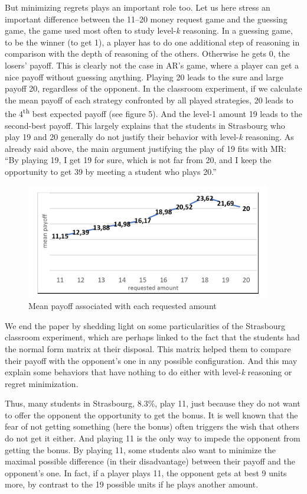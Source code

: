 \begin{Article}
\begin{refsection}[Umbhauer]
But minimizing regrets plays an important role too. Let us here stress
an important difference between the 11--20 money request game and the
guessing game, the game used most often to study level-\emph{k}
reasoning. In a guessing game, to be the winner (to get 1), a player has
to do one additional step of reasoning in comparison with the depth of
reasoning of the others. Otherwise he gets 0, the losers' payoff. This
is clearly not the case in AR's game, where a player can get a nice
payoff without guessing anything. Playing 20 leads to the sure and large
payoff 20, regardless of the opponent. In the classroom experiment, if
we calculate the mean payoff of each strategy confronted by all played
strategies, 20 leads to the 4\textsuperscript{th} best expected payoff
(see figure 5). And the level-1 amount 19 leads to the second-best
payoff. This largely explains that the students in Strasbourg who play
19 and 20 generally do not justify their behavior with level-\emph{k}
reasoning. As already said above, the main argument justifying the play
of 19 fits with MR: ``By playing 19, I get 19 for sure, which is not far
from 20, and I keep the opportunity to get 39 by meeting a student who
plays 20.''


\begin{figure}[h]
    \centering
    \caption{Mean payoff associated with each requested amount}
    \includegraphics[height=5cm]{Articles-bons-a-composer/07_Umbhauer_en/07_Umbhauer_en_figures/Umbhauer_fig5.jpeg}
\end{figure}


We end the paper by shedding light on some particularities of the
Strasbourg classroom experiment, which are perhaps linked to the fact
that the students had the normal form matrix at their disposal. This
matrix helped them to compare their payoff with the opponent's one in
any possible configuration. And this may explain some behaviors that
have nothing to do either with level-\emph{k} reasoning or regret
minimization.

Thus, many students in Strasbourg, 8.3\%, play 11, just because they do
not want to offer the opponent the opportunity to get the bonus. It is
well known that the fear of not getting something (here the bonus) often
triggers the wish that others do not get it either. And playing 11 is
the only way to impede the opponent from getting the bonus. By playing
11, some students also want to minimize the maximal possible difference
(in their disadvantage) between their payoff and the opponent's one. In
fact, if a player plays 11, the opponent gets at best 9 units more, by
contrast to the 19 possible units if he plays another amount.


\end{refsection}
\end{Article}
